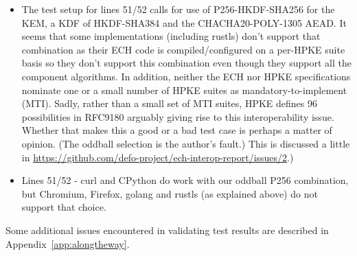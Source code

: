 \begin{itemize}
    \item The test setup for lines 51/52 calls for use of P256-HKDF-SHA256 for
        the KEM, a KDF of HKDF-SHA384 and the CHACHA20-POLY-1305 AEAD.  It
        seems that some implementations (including rustls) don't support that
        combination as their ECH code is compiled/configured on a per-HPKE suite basis
        so they don't support this combination even though they support all the
        component algorithms.  In addition, neither the ECH nor HPKE
        specifications nominate one or a small number of HPKE suites as
        mandatory-to-implement (MTI).  Sadly, rather than a small set of MTI
        suites, HPKE defines 96 possibilities in RFC9180 \cite{rfc9180}
        arguably giving rise to this interoperability issue.  Whether that
        makes this a good or a bad test case is perhaps a matter of opinion.
        (The oddball selection is the author's fault.) This is discussed a
        little in
        \url{https://github.com/defo-project/ech-interop-report/issues/2}.)

    \item Lines 51/52 - curl and CPython do work with our oddball P256
        combination, but Chromium, Firefox, golang and rustls (as explained above)
        do not support that choice.

\end{itemize}

Some additional issues encountered in validating test results are described
in Appendix~\ref{app:alongtheway}.

